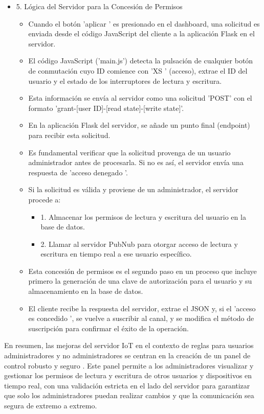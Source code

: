 \documentclass{report}
\begin{document}
\begin{itemize}
    \item 5. Lógica del Servidor para la Concesión de Permisos
    \begin{itemize}
        \item Cuando el botón  'aplicar ' es presionado en el dashboard, una solicitud es enviada desde el código JavaScript del cliente a la 
        aplicación Flask en el servidor.
        \item El código JavaScript ('main.js') detecta la pulsación de cualquier botón de conmutación cuyo ID comience con  'XS ' (acceso), 
        extrae el ID del usuario y el estado de los interruptores de lectura y escritura.
        \item Esta información se envía al servidor como una  solicitud 'POST'  con el formato 'grant-[user ID]-[read state]-[write state]'.
        \item En la aplicación Flask del servidor, se añade un  punto final (endpoint)  para recibir esta solicitud.
        \item Es  fundamental verificar que la solicitud provenga de un usuario administrador  antes de procesarla. Si no es así, el servidor 
        envía una respuesta de  'acceso denegado '.
        \item Si la solicitud es válida y proviene de un administrador, el servidor procede a:
        \begin{itemize}
            \item 1.   Almacenar los permisos  de lectura y escritura del usuario en la base de datos.
            \item 2.   Llamar al servidor PubNub  para otorgar acceso de lectura y escritura en tiempo real a ese usuario específico.        
        \end{itemize}
        \item Esta concesión de permisos es el segundo paso en un proceso que incluye primero la  generación de una clave de autorización  para 
        el usuario y su almacenamiento en la base de datos.
        \item El cliente recibe la respuesta del servidor, extrae el JSON y, si el  'acceso es concedido ', se vuelve a suscribir al canal, y se 
        modifica el método de suscripción para confirmar el éxito de la operación.
    \end{itemize}
\end{itemize}

En resumen, las mejoras del servidor IoT en el contexto de reglas para usuarios administradores y no administradores se centran en la creación de 
un  panel de control robusto y seguro . Este panel permite a los administradores  visualizar y gestionar los permisos de lectura y escritura  de 
otros usuarios y dispositivos en tiempo real, con una validación estricta en el lado del servidor para garantizar que solo los administradores 
puedan realizar cambios y que la comunicación sea segura de extremo a extremo.
\end{document}
